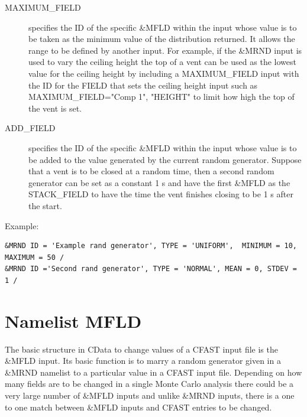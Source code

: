\documentclass[12pt,twoside]{book}
\begin{document}
\begin{description}
  \item[MAXIMUM\_FIELD] specifies the  ID of the specific \&MFLD  within the input whose value is to be taken as the minimum value of the distribution returned. It allows the range to be defined by another input. For example, if the {\ct \&MRND} input is used to vary the ceiling height the top of a vent can be used as the lowest value for the ceiling height by including a {\ct MAXIMUM\_FIELD} input with the {\ct ID} for the {\ct FIELD} that sets the ceiling height input such as {\ct MAXIMUM\_FIELD="Comp 1", "HEIGHT"} to limit how high the top of the vent is set.
  \item[ADD\_FIELD] specifies the  ID of the specific \&MFLD  within the input whose value is to be added to the value generated by the current random generator. Suppose that a vent is to be closed at a random time, then a second random generator can be set as a constant 1 s and have the first \&MFLD as the STACK\_FIELD  to have the time the vent finishes closing to be 1 s after the start.
\end{description}

\vspace{\baselineskip}
\noindent Example:
\begin{lstlisting}
&MRND ID = 'Example rand generator', TYPE = 'UNIFORM',  MINIMUM = 10, MAXIMUM = 50 /
&MRND ID ='Second rand generator', TYPE = 'NORMAL', MEAN = 0, STDEV = 1 /
\end{lstlisting}

\section{Namelist MFLD}
\label{info:MFLD}

The basic structure in CData to change values of a CFAST input file is the { \ct \&MFLD} input. Its basic function is to marry a random generator given in a { \ct \&MRND} namelist to a particular value in a CFAST input file. Depending on how many fields are to be changed in a single Monte Carlo analysis there could be a very large number of { \ct \&MFLD} inputs and unlike { \ct \&MRND } inputs, there is a one to one match between { \ct \&MFLD} inputs and CFAST entries to be changed.
\end{document}
